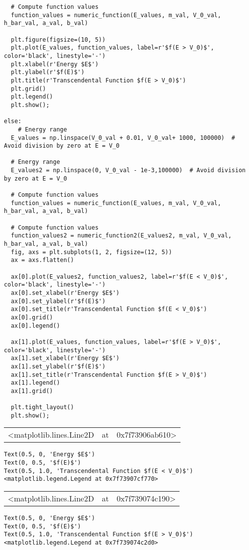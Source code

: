 \documentclass[11pt]{article}
\begin{document}
\begin{verbatim}
  # Compute function values
  function_values = numeric_function(E_values, m_val, V_0_val, h_bar_val, a_val, b_val)

  plt.figure(figsize=(10, 5))
  plt.plot(E_values, function_values, label=r'$f(E > V_0)$', color='black', linestyle='-')
  plt.xlabel(r'Energy $E$')
  plt.ylabel(r'$f(E)$')
  plt.title(r'Transcendental Function $f(E > V_0)$')
  plt.grid()
  plt.legend()
  plt.show();

else:
    # Energy range
  E_values = np.linspace(V_0_val + 0.01, V_0_val+ 1000, 100000)  # Avoid division by zero at E = V_0

  # Energy range
  E_values2 = np.linspace(0, V_0_val - 1e-3,100000)  # Avoid division by zero at E = V_0

  # Compute function values
  function_values = numeric_function(E_values, m_val, V_0_val, h_bar_val, a_val, b_val)

  # Compute function values
  function_values2 = numeric_function2(E_values2, m_val, V_0_val, h_bar_val, a_val, b_val)
  fig, axs = plt.subplots(1, 2, figsize=(12, 5))
  ax = axs.flatten()

  ax[0].plot(E_values2, function_values2, label=r'$f(E < V_0)$', color='black', linestyle='-')
  ax[0].set_xlabel(r'Energy $E$')
  ax[0].set_ylabel(r'$f(E)$')
  ax[0].set_title(r'Transcendental Function $f(E < V_0)$')
  ax[0].grid()
  ax[0].legend()

  ax[1].plot(E_values, function_values, label=r'$f(E > V_0)$', color='black', linestyle='-')
  ax[1].set_xlabel(r'Energy $E$')
  ax[1].set_ylabel(r'$f(E)$')
  ax[1].set_title(r'Transcendental Function $f(E > V_0)$')
  ax[1].legend()
  ax[1].grid()

  plt.tight_layout()
  plt.show();
\end{verbatim}

\label{org9799f51}
\begin{center}
\begin{tabular}{lll}
<matplotlib.lines.Line2D & at & 0x7f73906ab610>\\
\end{tabular}
\end{center}
\begin{verbatim}
Text(0.5, 0, 'Energy $E$')
Text(0, 0.5, '$f(E)$')
Text(0.5, 1.0, 'Transcendental Function $f(E < V_0)$')
<matplotlib.legend.Legend at 0x7f73907cf770>
\end{verbatim}

\begin{center}
\begin{tabular}{lll}
<matplotlib.lines.Line2D & at & 0x7f739074c190>\\
\end{tabular}
\end{center}
\begin{verbatim}
Text(0.5, 0, 'Energy $E$')
Text(0, 0.5, '$f(E)$')
Text(0.5, 1.0, 'Transcendental Function $f(E > V_0)$')
<matplotlib.legend.Legend at 0x7f739074c2d0>
\end{verbatim}
\end{document}
